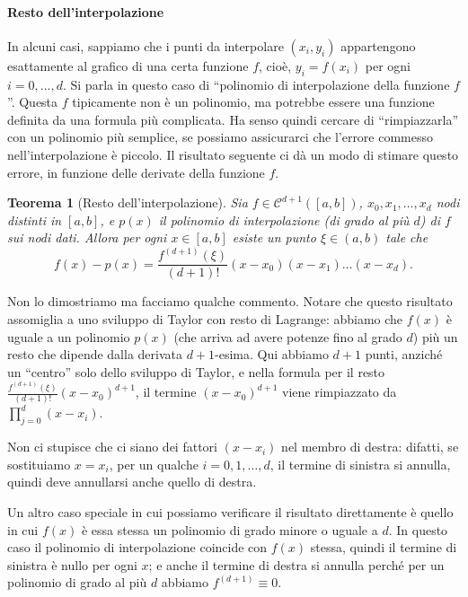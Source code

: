 \documentclass[a4paper]{report}
\newtheorem{theorem}{Teorema}[chapter]
\theoremstyle{definiton}
\theoremstyle{remark}
\begin{document}
\paragraph{Resto dell'interpolazione}
In alcuni casi, sappiamo che i punti da interpolare $(x_i,y_i)$ appartengono esattamente al grafico di una certa funzione $f$, cioè, $y_i = f(x_i)$ per ogni $i=0,\dots,d$. Si parla in questo caso di ``polinomio di interpolazione della funzione $f$''. Questa $f$ tipicamente non è un polinomio, ma potrebbe essere una funzione definita da una formula più complicata. Ha senso quindi cercare di ``rimpiazzarla'' con un polinomio più semplice, se possiamo assicurarci che l'errore commesso nell'interpolazione è piccolo. Il risultato seguente ci dà un modo di stimare questo errore, in funzione delle derivate della funzione $f$.
\begin{theorem}[Resto dell'interpolazione]
Sia $f\in \mathcal{C}^{d+1}([a,b])$, $x_0,x_1,\dots,x_d$ nodi distinti in $[a,b]$, e $p(x)$ il polinomio di interpolazione (di grado al più $d$) di $f$ sui nodi dati. Allora per ogni $x\in [a,b]$ esiste un punto $\xi \in (a,b)$ tale che
\begin{equation} \label{resto dell'interpolazione}
    f(x) - p(x) = \frac{f^{(d+1)}(\xi)}{(d+1)!} (x-x_0)(x-x_1) \dots (x-x_d).    
\end{equation}
\end{theorem}
Non lo dimostriamo ma facciamo qualche commento. Notare che questo risultato assomiglia a uno sviluppo di Taylor con resto di Lagrange: abbiamo che $f(x)$ è uguale a un polinomio $p(x)$ (che arriva ad avere potenze fino al grado $d$) più un resto che dipende dalla derivata $d+1$-esima. Qui abbiamo $d+1$ punti, anziché un ``centro'' solo dello sviluppo di Taylor, e nella formula per il resto $\frac{f^{(d+1)}(\xi)}{(d+1)!}(x-x_0)^{d+1}$, il termine $(x-x_0)^{d+1}$ viene rimpiazzato da $\prod_{j=0}^d (x-x_i)$.

Non ci stupisce che ci siano dei fattori $(x-x_i)$ nel membro di destra: difatti, se sostituiamo $x=x_i$, per un qualche $i=0,1,\dots,d$, il termine di sinistra si annulla, quindi deve annullarsi anche quello di destra.

Un altro caso speciale in cui possiamo verificare il risultato direttamente è quello in cui $f(x)$ è essa stessa un polinomio di grado minore o uguale a $d$. In questo caso il polinomio di interpolazione coincide con $f(x)$ stessa, quindi il termine di sinistra è nullo per ogni $x$; e anche il termine di destra si annulla perché per un polinomio di grado al più $d$ abbiamo $f^{(d+1)} \equiv 0$.
\end{document}
